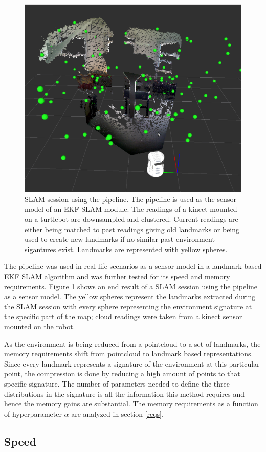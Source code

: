\documentclass [twoside,hidelinks]{article}
\begin{document}
\begin{figure}
  \centering
    \includegraphics [width=.5\textwidth]{SLAM110landmarks2}
    \caption{SLAM session using the pipeline. The pipeline is used as the sensor model of an EKF-SLAM module. The readings of a kinect mounted on a turtlebot are downsampled and clustered. Current readings are either being matched to past readings giving old landmarks or being used to create new landmarks if no similar past environment sigantures exist. Landmarks are represented with yellow spheres. }
  \label{SLAM}
\end{figure}


The pipeline was used in real life scenarios as a sensor model in a landmark based EKF SLAM algorithm and was further tested for its speed and memory requirements. Figure \ref{SLAM} shows an end result of a SLAM session using the pipeline as a sensor model. The yellow spheres represent the landmarks extracted during the SLAM session with every sphere representing the environment signature at the specific part of the map; cloud readings were taken from a kinect sensor mounted on the robot.


As the environment is being reduced from a pointcloud to a set of landmarks, the memory requirements shift from pointcloud to landmark based representations. Since every landmark represents a signature of the environment at this particular point, the compression is done by reducing a high amount of points to that specific signature. The number of parameters needed to define the three distributions in the signature is all the information this method requires and hence the memory gains are substantial. The memory requirements as a function of hyperparameter $\alpha$ are analyzed in section \ref{reqs}. 

\subsection{Speed}
\end{document}
